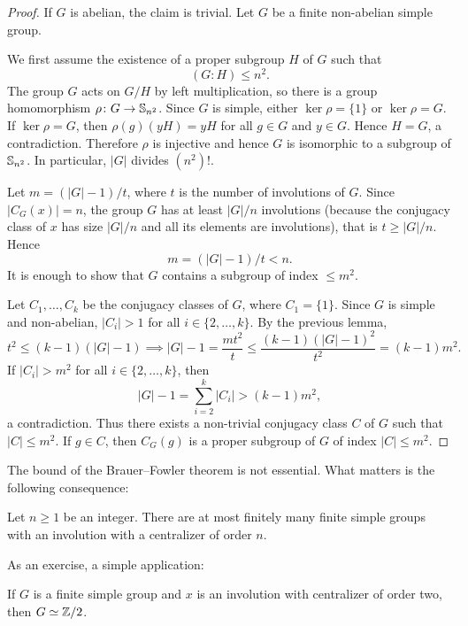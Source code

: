 \begin{proof}
    If $G$ is abelian, the claim is trivial. Let $G$ be a finite non-abelian simple group.
    
    We first assume the existence of a proper subgroup $H$ of $G$ 
    such that 
    \[
    (G:H)\leq n^2.
    \]
    The group $G$ acts on $G/H$ 
    by left multiplication, so there is a group homomorphism 
    $\rho\colon G\to\mathbb{S}_{n^2}$. Since $G$ is simple, either 
    $\ker\rho=\{1\}$ or $\ker\rho=G$. If $\ker\rho=G$, then
    $\rho(g)(yH)=yH$ for all $g\in G$ and $y\in G$. 
    Hence $H=G$, a contradiction. Therefore $\rho$ is injective
    and hence $G$ is isomorphic to a subgroup of $\mathbb{S}_{n^2}$. 
    In particular, $|G|$ divides $(n^2)!$. 

    Let $m=(|G|-1)/t$, where $t$ is the number of involutions of $G$. 
    Since $|C_G(x)|=n$, the group $G$ has at least $|G|/n$ involutions (because
    the conjugacy class of $x$ has size $|G|/n$ and all its elements are involutions), 
    that is $t\geq |G|/n$. Hence 
    \[
    m=(|G|-1)/t<n.
    \]
    It is enough to show that
    $G$ contains a subgroup of index $\leq m^2$. 

    Let $C_1,\dots,C_k$ be the conjugacy classes of $G$, where $C_1=\{1\}$. 
    Since $G$ is simple and non-abelian, $|C_i|>1$ 
    for all $i\in\{2,\dots,k\}$. By the previous lemma, 
    \[
    t^2\leq(k-1)(|G|-1)\implies |G|-1=\frac{mt^2}{t}\leq\frac{(k-1)(|G|-1)^2}{t^2}=(k-1)m^2.
    \]
    If $|C_i|>m^2$ for all $i\in\{2,\dots,k\}$, then
    \[
    |G|-1=\sum_{i=2}^k|C_i|>(k-1)m^2,
    \]
    a contradiction. Thus there exists a non-trivial conjugacy class
    $C$ of $G$ such that $|C|\leq m^2$. If $g\in C$, then
    $C_G(g)$ is a proper subgroup of $G$ of index $|C|\leq m^2$.
\end{proof}

The bound of the Brauer--Fowler theorem is not essential.
What matters is the following consequence:

\begin{corollary}
    Let $n\geq 1$ be an integer. There are at most finitely many 
    finite simple groups with an involution with a centralizer of order $n$.
\end{corollary}

As an exercise, a simple application: 

\begin{exercise}
    If $G$ is a finite simple group and $x$ is an involution with
    centralizer of order two, then  
    $G\simeq\mathbb{Z}/2$. 
\end{exercise}

